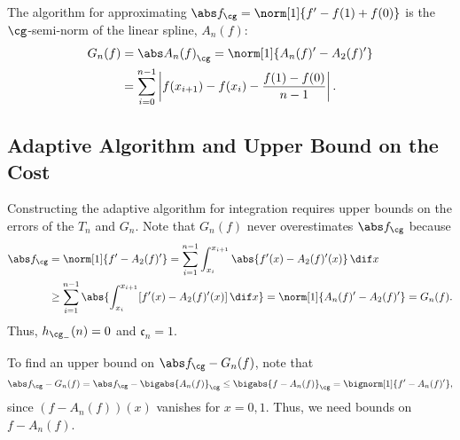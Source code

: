 The algorithm for approximating $\Gnorm{f}=\norm[1]{f'-f(1)+f(0)}$ is the $\cg$-semi-norm of the linear spline, $A_n(f)$:
\begin{multline}\label{1direst}
    G_n(f)=\Gnorm{A_n(f)}=\norm[1]{A_n(f)'-A_2(f)'} \\
    =\sum_{i=0}^{n-1}\left|f(x_{i+1})-f(x_{i}) - \frac{f(1)-f(0)}{n-1}\right|.
\end{multline} 

\subsection{Adaptive Algorithm and Upper Bound on the Cost}

Constructing the adaptive algorithm for integration requires upper bounds on the errors of the $T_n$ and $G_n$.  Note that $G_{n}(f)$ never overestimates $\Gnorm{f}$ because 
\begin{align*}
\Gnorm{f} & = \norm[1]{f'-A_2(f)'} 
= \sum_{i=1}^{n-1} \int_{x_i}^{x_{i+1}} \abs{f'(x) - A_2(f)'(x)} \, \dif x \\
& \ge \sum_{i=1}^{n-1} \abs{\int_{x_i}^{x_{i+1}} [f'(x) - A_2(f)'(x)] \, \dif x}=\norm[1]{A_n(f)'-A_2(f)'} = G_n(f).
\end{align*}
Thus, $h_{\cg_{-}}(n)=0$ and $\mathfrak{c}_n=1$. 

To find an upper bound on $\Gnorm{f}-G_{n}(f)$, note that 
\begin{equation*}
\Gnorm{f} - G_{n}(f) = \Gnorm{f} - \bigabs{A_n(f)}_{\cg} \le \bigabs{f-A_n(f)}_{\cg} = \bignorm[1]{f' -A_n(f)'},
\end{equation*}
since $(f-A_n(f))(x)$ vanishes for $x=0,1$.  Thus, we need bounds on $f-A_n(f)$.

